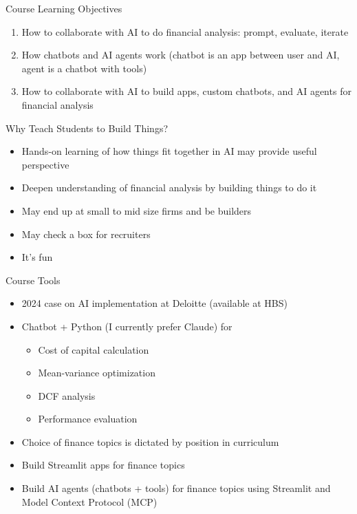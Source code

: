 \documentclass{beamer}
\begin{document}
\begin{frame}{Course Learning Objectives}
\begin{enumerate}
\item How to collaborate with AI to do financial analysis: prompt, evaluate, iterate
\item How chatbots and AI agents work (chatbot is an app between user and AI, agent is a chatbot with tools)
\item How to collaborate with AI to build apps, custom chatbots, and AI agents for financial analysis
\end{enumerate}
\end{frame}

\begin{frame}{Why Teach Students to Build Things?}
\begin{itemize}
\item Hands-on learning of how things fit together in AI may provide useful perspective
\item Deepen understanding of financial analysis by building things to do it
\item May end up at small to mid size firms and be builders
\item May check a box for recruiters
\item It's fun
\end{itemize}
\end{frame}

\begin{frame}{Course Tools}
    \begin{itemize}
    \item 2024 case on AI implementation at Deloitte (available at HBS)
    \pause
    \item Chatbot + Python (I currently prefer Claude) for 
    \begin{itemize}
    \item Cost of capital calculation
    \item Mean-variance optimization
    \item DCF analysis
    \item Performance evaluation
    \end{itemize}
    \pause
    \item Choice of finance topics is dictated by position in curriculum
    \pause
    \item Build Streamlit apps for finance topics
    \item Build AI agents (chatbots + tools) for finance topics using Streamlit and Model Context Protocol (MCP)
    \end{itemize}
\end{frame}
\end{document}
